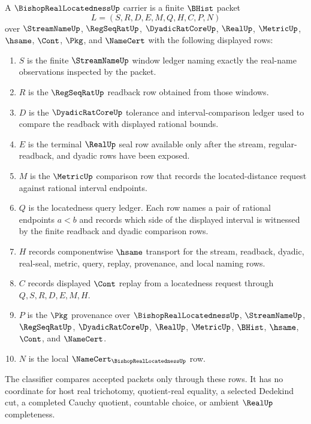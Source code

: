 \begin{definition}
\label{def:bishop-real-locatedness-carrier}
A $\BishopRealLocatednessUp$ carrier is a finite $\BHist$ packet
$$
L=(S,R,D,E,M,Q,H,C,P,N)
$$
over $\StreamNameUp$, $\RegSeqRatUp$, $\DyadicRatCoreUp$, $\RealUp$, $\MetricUp$, $\hsame$, $\Cont$, $\Pkg$, and $\NameCert$ with the following displayed rows:
\begin{enumerate}
\item $S$ is the finite $\StreamNameUp$ window ledger naming exactly the real-name observations inspected by the packet.
\item $R$ is the $\RegSeqRatUp$ readback row obtained from those windows.
\item $D$ is the $\DyadicRatCoreUp$ tolerance and interval-comparison ledger used to compare the readback with displayed rational bounds.
\item $E$ is the terminal $\RealUp$ seal row available only after the stream, regular-readback, and dyadic rows have been exposed.
\item $M$ is the $\MetricUp$ comparison row that records the located-distance request against rational interval endpoints.
\item $Q$ is the locatedness query ledger. Each row names a pair of rational endpoints $a<b$ and records which side of the displayed interval is witnessed by the finite readback and dyadic comparison rows.
\item $H$ records componentwise $\hsame$ transport for the stream, readback, dyadic, real-seal, metric, query, replay, provenance, and local naming rows.
\item $C$ records displayed $\Cont$ replay from a locatedness request through $Q,S,R,D,E,M,H$.
\item $P$ is the $\Pkg$ provenance over $\BishopRealLocatednessUp$, $\StreamNameUp$, $\RegSeqRatUp$, $\DyadicRatCoreUp$, $\RealUp$, $\MetricUp$, $\BHist$, $\hsame$, $\Cont$, and $\NameCert$.
\item $N$ is the local $\NameCert_{\BishopRealLocatednessUp}$ row.
\end{enumerate}
The classifier compares accepted packets only through these rows. It has no coordinate for host real trichotomy, quotient-real equality, a selected Dedekind cut, a completed Cauchy quotient, countable choice, or ambient $\RealUp$ completeness.
\end{definition}

